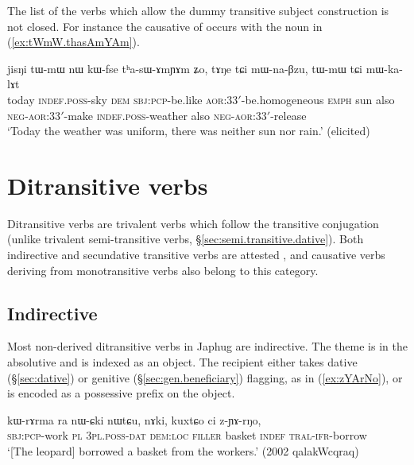 The list of the verbs which allow the dummy transitive subject construction is not closed. For instance the causative of  occurs with the noun  in (\ref{ex:tWmW.thasAmYAm}).

\begin{exe}
\ex \label{ex:tWmW.thasAmYAm}
\gll  jisŋi tɯ-mɯ nɯ kɯ-fse tʰa-sɯ-ɤmɲɤm ʑo, tɤŋe tɕi mɯ-na-βzu, tɯ-mɯ tɕi mɯ-ka-lɤt \\
today \textsc{indef}.\textsc{poss}-sky \textsc{dem} \textsc{sbj}:\textsc{pcp}-be.like \textsc{aor}:3\fl{}3$'$-be.homogeneous \textsc{emph} sun also \textsc{neg}-\textsc{aor}:3\fl{}3$'$-make  \textsc{indef}.\textsc{poss}-weather also \textsc{neg}-\textsc{aor}:3\fl{}3$'$-release \\ 
\glt  `Today the weather was uniform, there was neither sun nor rain.' (elicited)
\end{exe}

\section{Ditransitive verbs} \label{sec:ditransitive}
Ditransitive verbs are trivalent verbs which follow the transitive conjugation (unlike trivalent semi-transitive verbs, §\ref{sec:semi.transitive.dative}). Both indirective and secundative transitive verbs are attested \citep{malchukov10ditransitive}, and causative verbs deriving from monotransitive verbs also belong to this category.


\subsection{Indirective} \label{sec:ditransitive.indirective}
Most non-derived ditransitive verbs in Japhug are indirective. The theme is in the absolutive and is indexed as an object. The recipient either takes dative (§\ref{sec:dative}) or genitive (§\ref{sec:gen.beneficiary}) flagging, as in (\ref{ex:zYArNo}), or is encoded as a possessive prefix on the object.

\begin{exe}
	\ex \label{ex:zYArNo}
	\gll kɯ-rɤrma ra nɯ-ɕki nɯtɕu, nɤki, kuxtɕo ci z-ɲɤ-rŋo, \\
	\textsc{sbj}:\textsc{pcp}-work \textsc{pl} \textsc{3pl}.\textsc{poss}-\textsc{dat} \textsc{dem}:\textsc{loc} \textsc{filler} basket \textsc{indef} \textsc{tral}-\textsc{ifr}-borrow \\
	\glt  `[The leopard] borrowed a basket from the workers.' (2002 qalakWcqraq)
\end{exe}

